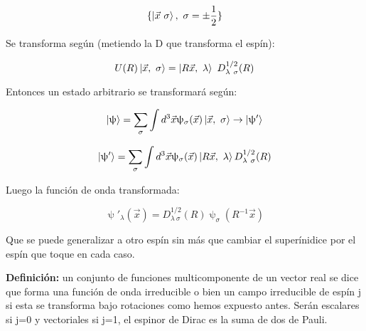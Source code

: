 $$\{ \ket{\Vec{x} \ \sigma},  \ \sigma = \pm \frac{1}{2}\}$$

Se transforma según (metiendo la D que transforma el espín):

$$U(R)\ket{\Vec{x}, \ \sigma} = \ket{R\Vec{x}, \ \lambda} \ D_{\lambda \ \sigma}^{1/2}(R)$$

Entonces un estado arbitrario se transformará según:

$$\ket{\uppsi} = \sum _\sigma \int d^3\Vec{x} \uppsi _\sigma (\Vec{x}) \ket{\Vec{x}, \ \sigma} \to \ket{\uppsi '}$$

$$\ket{\uppsi '}= \sum _\sigma \int d^3\Vec{x} \uppsi _\sigma (\Vec{x})\ket{R\Vec{x}, \ \lambda} D_{\lambda \ \sigma}^{1/2} (R)$$

Luego la función de onda transformada:

$$\uppsi '_\lambda (\Vec{x})= D^{1/2}_{\lambda \ \sigma}(R) \uppsi _\sigma (R^{-1}\Vec{x})$$

Que se puede generalizar a otro espín sin más que cambiar el superínidice por el espín que toque en cada caso.

\smallskip
\textbf{Definición:} un conjunto de funciones multicomponente de un vector real se dice que forma una función de onda irreducible o bien un campo irreducible de espín j si esta se transforma bajo rotaciones como hemos expuesto antes. Serán escalares si j=0 y vectoriales si j=1, el espinor de Dirac es la suma de dos de Pauli.


\newpage
